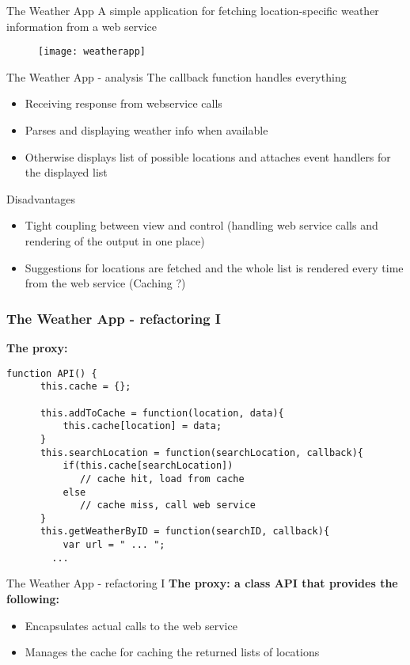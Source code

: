 \documentclass{beamer}
\begin{document}
 \begin{frame}{The Weather App}
A simple application for fetching location-specific weather information from a web service
    \begin{figure}[htp]
    \centering
    \texttt{[image: weatherapp]}
    \label{fig:weather}
    \end{figure}
    
\end{frame}

\begin{frame}{The Weather App - analysis}
The callback function handles everything
    \begin{itemize}
      \item Receiving response from webservice calls
      \item Parses and displaying weather info when available
      \item Otherwise displays list of possible locations and attaches event handlers for the displayed list
    \end{itemize}
    \begin{block}{Disadvantages}
      \begin{itemize}
    \item Tight coupling between view and control (handling web service calls and rendering of the output in one place)
    \item Suggestions for locations are fetched and the whole list is rendered every time from the web service (Caching ?)
    \end{itemize}
    \end{block}
\end{frame}

\begin{frame}[fragile]
\frametitle{The Weather App - refactoring I}
\textbf{The proxy:}
\begin{lstlisting}
function API() {
	  this.cache = {};
	  
	  this.addToCache = function(location, data){
		  this.cache[location] = data; 
	  }
	  this.searchLocation = function(searchLocation, callback){
		  if(this.cache[searchLocation])
		     // cache hit, load from cache
		  else
		     // cache miss, call web service
	  }
	  this.getWeatherByID = function(searchID, callback){
		  var url = " ... ";
        ...
\end{lstlisting}
\end{frame}

\begin{frame}{The Weather App - refactoring I}
\textbf{The proxy: a class API that provides the following:}
   \begin{itemize}
    \item Encapsulates actual calls to the web service
    \item Manages the cache for caching the returned lists of locations
    \end{itemize}
\end{frame}
\end{document}
